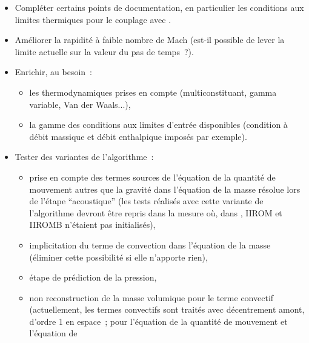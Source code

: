 \begin{itemize}
\begin{itemize}
        \^etre utile d'extrapoler le gradient de pression au bord~:
        la pression d\'epend de la temp\'erature et une simple condition de
        Neumann homog\`ene est susceptible de cr\'eer un terme source de
        quantit\'e de mouvement parasite),
        \item maillage non conforme (non conformit\'e dans la direction
        transverse d'un canal),
      \item ``tube à choc'' avec terme source d'énergie.
        \end{itemize}
\item Compl\'eter certains points de documentation, en particulier les
        conditions aux limites thermiques pour le couplage avec \syrthes.
\item Am\'eliorer la rapidit\'e \`a faible nombre de Mach (est-il
possible de lever la limite
actuelle sur la valeur du pas de temps~?).
\item Enrichir, au besoin~:
        \begin{itemize}
        \item les thermodynamiques prises en compte (multiconstituant,
        gamma variable, Van der Waals...),
        \item la gamme des conditions aux limites d'entr\'ee
        disponibles (condition \`a d\'ebit massique et d\'ebit enthalpique
        impos\'es par exemple).
        \end{itemize}
\item Tester des variantes de l'algorithme~:
        \begin{itemize}
        \item prise en compte des termes sources de l'\'equation de la
        quantit\'e de mouvement autres que la gravit\'e dans l'\'equation de la
        masse r\'esolue lors de l'\'etape ``acoustique'' (les tests r\'ealis\'es
        avec cette variante de l'algorithme devront \^etre repris dans la
        mesure o\`u, dans , IIROM et IIROMB n'\'etaient pas
        initialis\'es),
        \item implicitation du terme de convection dans
        l'\'equation de la masse (\'eliminer cette possibilit\'e si
        elle n'apporte rien),
        \item \'etape de pr\'ediction de la pression,
        \item non reconstruction de la masse volumique pour le terme convectif
        (actuellement, les termes convectifs sont trait\'es avec
        d\'ecentrement amont, d'ordre 1 en espace~;
        pour l'\'equation de la quantit\'e de mouvement et l'\'equation de

\end{itemize}
\end{itemize}
